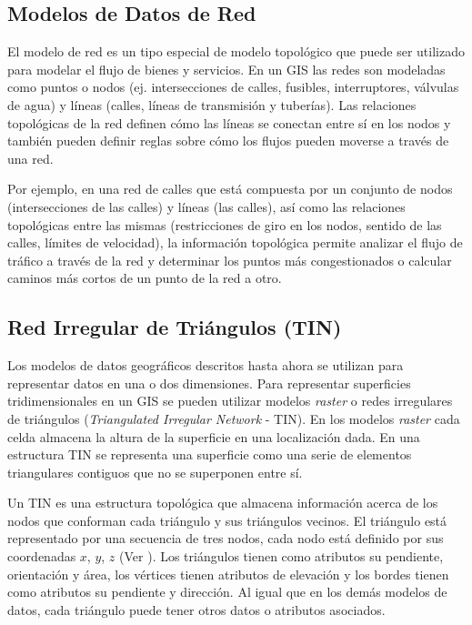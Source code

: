 \subsection{Modelos de Datos de Red}

El modelo de red es un tipo especial de modelo topológico que puede ser utilizado para modelar el flujo de bienes y servicios. En un GIS las redes son modeladas como puntos o nodos (ej. intersecciones de calles, fusibles, interruptores, válvulas de agua) y líneas (calles, líneas de transmisión y tuberías). Las relaciones topológicas de la red definen cómo las líneas se conectan entre sí en los nodos y también pueden definir reglas sobre cómo los flujos pueden moverse a través de una red.

Por ejemplo, en una red de calles que está compuesta por un conjunto de nodos (intersecciones de las calles) y líneas (las calles), así como las relaciones topológicas entre las mismas (restricciones de giro en los nodos, sentido de las calles, límites de velocidad), la información topológica permite analizar el flujo de tráfico a través de la red y determinar los puntos más congestionados o calcular caminos más cortos de un punto de la red a otro.

\subsection{Red Irregular de Triángulos (TIN)}

Los modelos de datos geográficos descritos hasta ahora se utilizan para representar datos en una o dos dimensiones. Para representar superficies tridimensionales en un GIS se pueden utilizar modelos \emph{raster} o redes irregulares de triángulos (\emph{Triangulated Irregular Network} - TIN). En los modelos \emph{raster} cada celda almacena la altura de la superficie en una localización dada. En una estructura TIN se representa una superficie como una serie de elementos triangulares contiguos que no se superponen entre sí.

Un TIN es una estructura topológica que almacena información acerca de los nodos que conforman cada triángulo y sus triángulos vecinos. El triángulo está representado por una secuencia de tres nodos, cada nodo está definido por sus coordenadas $x$, $y$, $z$ (Ver ). Los triángulos tienen como atributos su pendiente, orientación y área, los vértices tienen atributos de elevación y los bordes tienen como atributos su pendiente y dirección. Al igual que en los demás modelos de datos, cada triángulo puede tener otros datos o atributos asociados.

